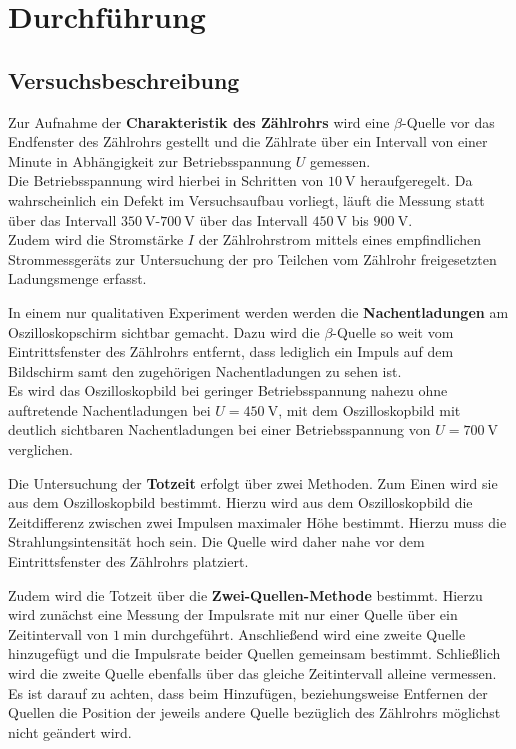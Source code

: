 \section{Durchführung}
\label{sec:Durchführung}



\subsection{Versuchsbeschreibung}
\label{sec:Versuchsbeschreibung}
Zur Aufnahme der \textbf{Charakteristik des Zählrohrs} wird eine $\beta$-Quelle vor das Endfenster des Zählrohrs gestellt und die Zählrate über ein Intervall von einer Minute in Abhängigkeit zur Betriebsspannung $U$ gemessen.\\
Die Betriebsspannung wird hierbei in Schritten von $\SI{10}{\volt}$ heraufgeregelt.
Da wahrscheinlich ein Defekt im Versuchsaufbau vorliegt, läuft die Messung statt über das Intervall $\SI{350}{\volt}$-$\SI{700}{\volt}$ über das Intervall $\SI{450}{\volt}$ bis $\SI{900}{\volt}$.\\
Zudem wird die Stromstärke $I$ der Zählrohrstrom mittels eines empfindlichen Strommessgeräts zur Untersuchung der pro Teilchen vom Zählrohr freigesetzten Ladungsmenge erfasst.

In einem nur qualitativen Experiment werden werden die \textbf{Nachentladungen} am Oszilloskopschirm sichtbar gemacht.
Dazu wird die $\beta$-Quelle so weit vom Eintrittsfenster des Zählrohrs entfernt, dass lediglich ein Impuls auf dem Bildschirm samt den zugehörigen Nachentladungen zu sehen ist.\\
Es wird das Oszilloskopbild bei geringer Betriebsspannung nahezu ohne auftretende Nachentladungen bei $U=\SI{450}{\volt}$, mit dem Oszilloskopbild mit deutlich sichtbaren Nachentladungen bei einer Betriebsspannung von $U=\SI{700}{\volt}$ verglichen.

Die Untersuchung der \textbf{Totzeit} erfolgt über zwei Methoden.
Zum Einen wird sie aus dem Oszilloskopbild bestimmt.
Hierzu wird aus dem Oszilloskopbild die Zeitdifferenz zwischen zwei Impulsen maximaler Höhe bestimmt. Hierzu muss die Strahlungsintensität hoch sein. Die Quelle wird daher nahe vor dem Eintrittsfenster des Zählrohrs platziert.

Zudem wird die Totzeit über die \textbf{Zwei-Quellen-Methode} bestimmt.
Hierzu wird zunächst eine Messung der Impulsrate mit nur einer Quelle über ein Zeitintervall von $\SI{1}{\minute}$ durchgeführt.
Anschließend wird eine zweite Quelle hinzugefügt und die Impulsrate beider Quellen gemeinsam bestimmt. Schließlich wird die zweite Quelle ebenfalls über das gleiche Zeitintervall alleine vermessen.
Es ist darauf zu achten, dass beim Hinzufügen, beziehungsweise Entfernen der Quellen die Position der jeweils andere Quelle bezüglich des Zählrohrs möglichst nicht geändert wird.
